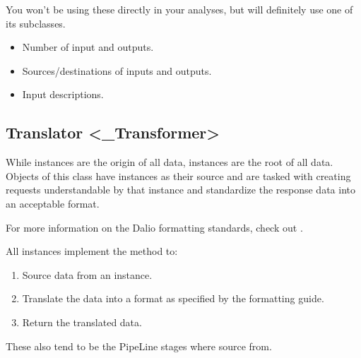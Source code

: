 \documentclass[letterpaper,10pt,english]{sphinxmanual}
\begin{document}
You won’t be using these directly in your analyses, but will definitely use one of its subclasses.

\begin{itemize}
\item {} 
Number of input and outputs.

\item {} 
Sources/destinations of inputs and outputs.

\item {} 
Input descriptions.

\end{itemize}


\subsection{Translator \textless{}\_Transformer\textgreater{}}
\label{\detokenize{beginners-guide:translator-transformer}}


While  instances are the origin of all data,  instances are the root of all  data. Objects of this class have  instances as their source and are tasked with creating requests understandable by that instance and standardize the response data into an acceptable format.

For more information on the Dal\sphinxhyphen{}io formatting standards, check out .

All  instances implement the  method to:
\begin{enumerate}
%
\item {} 
Source data from an  instance.

\item {} 
Translate the data into a format as specified by the formatting guide.

\item {} 
Return the translated data.

\end{enumerate}

These also tend to be the PipeLine stages where  source from.
\end{document}
